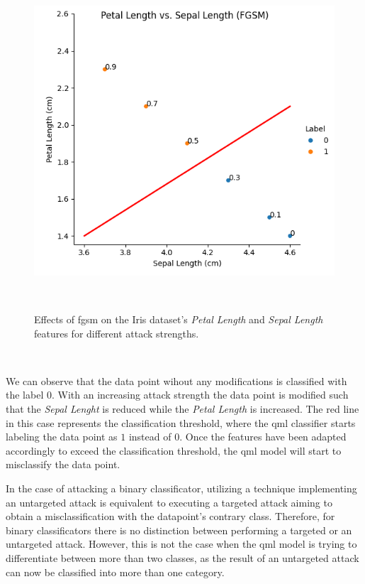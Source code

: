 \begin{figure}[h!]
  \includegraphics[scale=0.75]{figures/tabular-adversarial.png}
  \centering
  \caption{Effects of \ac{fgsm} on the Iris dataset's \textit{Petal Length} and \textit{Sepal Length} features for different attack strengths.}
~\label{fig:adversarial_tabular}
\end{figure} \

We can observe that the data point wihout any modifications
is classified with the label \(0\). With an increasing attack
strength the data point is modified such that the \textit{Sepal
Lenght} is reduced while the \textit{Petal Length} is increased.
The red line in this case represents the classification threshold,
where the \ac{qml} classifier starts labeling the data point as
\(1\) instead of \(0\). Once the features have been adapted
accordingly to exceed the classification threshold, the \ac{qml}
model will start to misclassify the data point. \

In the case of attacking a binary classificator, utilizing
a technique implementing an untargeted attack is equivalent
to executing a targeted attack aiming to obtain a misclassification
with the datapoint's contrary class. Therefore, for binary
classificators there is no distinction between performing a
targeted or an untargeted attack. However, this is not the case when
the \ac{qml} model is trying to differentiate between more than
two classes, as the result of an untargeted attack can now
be classified into more than one category. \

